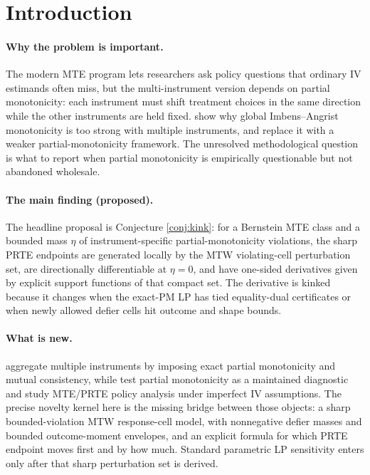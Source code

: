 \documentclass[11pt]{article}
\theoremstyle{definition}
\theoremstyle{plain}
\theoremstyle{remark}
\begin{document}
\section{Introduction}
\paragraph{Why the problem is important.}
The modern MTE program lets researchers ask policy questions that ordinary IV estimands often miss, but the multi-instrument version depends on partial monotonicity: each instrument must shift treatment choices in the same direction while the other instruments are held fixed.  \citet{MogstadTorgovitskyWalters2021} show why global Imbens--Angrist monotonicity is too strong with multiple instruments, and \citet{MogstadTorgovitskyWalters2024} replace it with a weaker partial-monotonicity framework.  The unresolved methodological question is what to report when partial monotonicity is empirically questionable but not abandoned wholesale.

\paragraph{The main finding (proposed).}
The headline proposal is Conjecture \ref{conj:kink}: for a Bernstein MTE class and a bounded mass \(\eta\) of instrument-specific partial-monotonicity violations, the sharp PRTE endpoints are generated locally by the MTW violating-cell perturbation set, are directionally differentiable at \(\eta=0\), and have one-sided derivatives given by explicit support functions of that compact set.  The derivative is kinked because it changes when the exact-PM LP has tied equality-dual certificates or when newly allowed defier cells hit outcome and shape bounds.

\paragraph{What is new.}
\citet{MogstadTorgovitskyWalters2024} aggregate multiple instruments by imposing exact partial monotonicity and mutual consistency, while \citet{JiangSun2023} test partial monotonicity as a maintained diagnostic and \citet{MourifieWan2025} study MTE/PRTE policy analysis under imperfect IV assumptions.  The precise novelty kernel here is the missing bridge between those objects: a sharp bounded-violation MTW response-cell model, with nonnegative defier masses and bounded outcome-moment envelopes, and an explicit formula for which PRTE endpoint moves first and by how much.  Standard parametric LP sensitivity enters only after that sharp perturbation set is derived.
\end{document}
